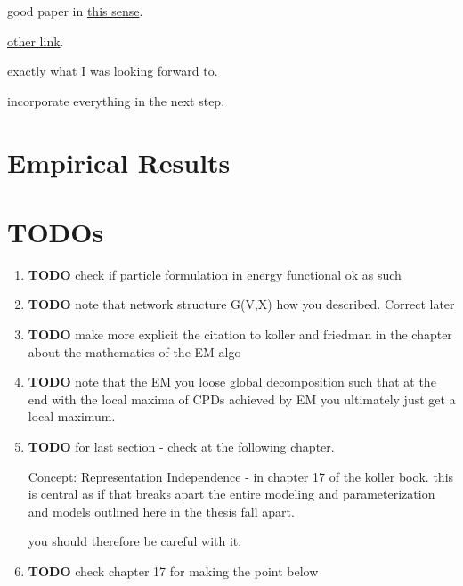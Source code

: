\documentclass[11pt]{article}
\begin{document}
\begin{article}
\begin{enumerate}
good paper in \href{https://arxiv.org/pdf/1608.01734.pdf}{this sense}.

\href{https://scholar.google.com/scholar?q=Method\%20for\%20Computation\%20of\%20the\%20Fisher\%20Information\%20Matrix\%20in\%20the\%20Expectation\%2DMaximization\%20Algorithm\&btnG=Search\&as\_sdt=800000000001\&as\_sdtp=on}{other link}.

exactly what I was looking forward to.

incorporate everything in the next step.
\end{enumerate}


\section{Empirical Results}
\label{sec:org93af4f5}



\newpage



\section{TODOs}
\label{sec:orgaadf751}

\begin{enumerate}
\item {\bfseries\sffamily TODO} check if particle formulation in energy functional ok as such
\label{sec:org35c1653}
\item {\bfseries\sffamily TODO} note that network structure G(V,X) how you described. Correct later
\label{sec:orgfdffe59}
\item {\bfseries\sffamily TODO} make more explicit the citation to koller and friedman in the chapter about the mathematics of the EM algo
\label{sec:orgb365d6b}
\item {\bfseries\sffamily TODO} note that the EM you loose global decomposition such that at the end with the local maxima of CPDs achieved by EM you ultimately just get a local maximum.
\label{sec:orgd8001b2}
\item {\bfseries\sffamily TODO} for last section - check at the following chapter.
\label{sec:org7fd180e}

Concept: Representation Independence - in chapter 17 of the
koller book. this is central as if that breaks apart the entire
modeling and parameterization and models outlined here in the
thesis fall apart.

you should therefore be careful with it.

\item {\bfseries\sffamily TODO} check chapter 17 for making the point below
\label{sec:orgd5126f4}


\end{enumerate}
\end{article}
\end{document}
